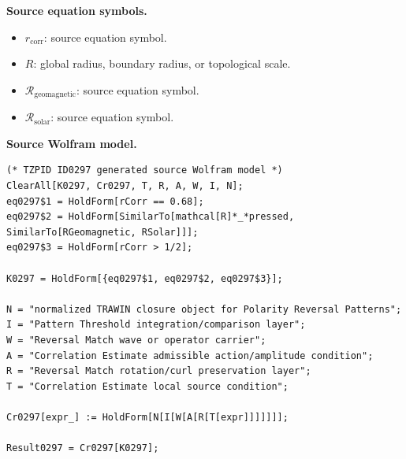 \begin{minipage}[t]{0.49\linewidth}
\begingroup
\small
\raggedright
\textbf{Source equation symbols.}\par
\begin{itemize}[leftmargin=1.35em,itemsep=1pt,topsep=1pt,parsep=0pt]
    \item $r_{\mathrm{corr}}$: source equation symbol.
    \item $R$: global radius, boundary radius, or topological scale.
    \item $\mathcal{R}_{\mathrm{geomagnetic}}$: source equation symbol.
    \item $\mathcal{R}_{\mathrm{solar}}$: source equation symbol.
\end{itemize}
\endgroup
\end{minipage}\hfill
\begin{minipage}[t]{0.47\linewidth}
\begingroup
\scriptsize
\raggedright
\textbf{Source Wolfram model.}\par
\begin{Verbatim}[fontsize=\tiny,breaklines=true,breakanywhere=true]
(* TZPID ID0297 generated source Wolfram model *)
ClearAll[K0297, Cr0297, T, R, A, W, I, N];
eq0297$1 = HoldForm[rCorr == 0.68];
eq0297$2 = HoldForm[SimilarTo[mathcal[R]*_*pressed, SimilarTo[RGeomagnetic, RSolar]]];
eq0297$3 = HoldForm[rCorr > 1/2];

K0297 = HoldForm[{eq0297$1, eq0297$2, eq0297$3}];

N = "normalized TRAWIN closure object for Polarity Reversal Patterns";
I = "Pattern Threshold integration/comparison layer";
W = "Reversal Match wave or operator carrier";
A = "Correlation Estimate admissible action/amplitude condition";
R = "Reversal Match rotation/curl preservation layer";
T = "Correlation Estimate local source condition";

Cr0297[expr_] := HoldForm[N[I[W[A[R[T[expr]]]]]]];

Result0297 = Cr0297[K0297];
\end{Verbatim}
\endgroup
\end{minipage}

